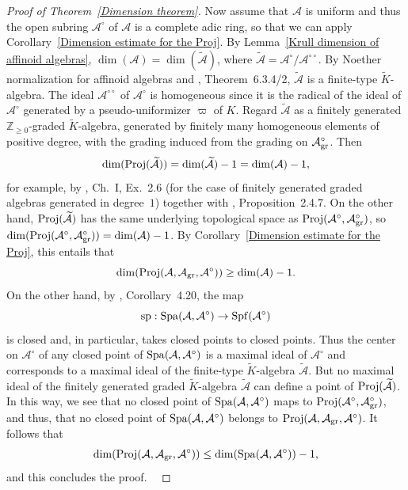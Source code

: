 \documentclass[12pt,twoside,a4paper]{article}
\theoremstyle{definition}
\theoremstyle{remark}
\newcommand\gr{{\rm gr}}
\newcommand\Proj{{\rm Proj}}
\newcommand\spc{{\rm sp}}
\newcommand\Spa{{\rm Spa}}
\newcommand\Spf{{\rm Spf}}
\begin{document}
\begin{proof}[Proof of Theorem~\ref{Dimension theorem}]
Now assume that $\mathcal{A}$ is uniform and thus the open subring $\mathcal{A}^{\circ}$ of $\mathcal{A}$ is a complete adic ring, so that we can apply Corollary~\ref{Dimension estimate for the Proj}. By Lemma~\ref{Krull dimension of affinoid algebras}, $\dim(\mathcal{A})=\dim(\widetilde{\mathcal{A}})$, where $\widetilde{\mathcal{A}}=\mathcal{A}^{\circ}/\mathcal{A}^{\circ\circ}$. By Noether normalization for affinoid algebras and \cite{BGR}, Theorem~6.3.4/2, $\widetilde{\mathcal{A}}$ is a finite-type $\widetilde{K}$-algebra. The ideal $\mathcal{A}^{\circ\circ}$ of $\mathcal{A}^{\circ}$ is homogeneous since it is the radical of the ideal of $\mathcal{A}^{\circ}$ generated by a pseudo-uniformizer $\varpi$ of $K$. Regard $\widetilde{\mathcal{A}}$ as a finitely generated $\mathbb{Z}_{\geq0}$-graded $\widetilde{K}$-algebra, generated by finitely many homogeneous elements of positive degree, with the grading induced from the grading on $\mathcal{A}_{\gr}^{\circ}$. Then \begin{equation*}\dim(\Proj(\widetilde{\mathcal{A}}))=\dim(\widetilde{\mathcal{A}})-1=\dim(\mathcal{A})-1,\end{equation*}for example, by \cite{Hartshorne}, Ch.~I, Ex.~2.6 (for the case of finitely generated graded algebras generated in degree~$1$) together with \cite{EGAII}, Proposition~2.4.7. On the other hand, $\Proj(\widetilde{\mathcal{A}})$ has the same underlying topological space as $\Proj(\mathcal{A}^{\circ}, \mathcal{A}_{\gr}^{\circ})$, so $\dim(\Proj(\mathcal{A}^{\circ}, \mathcal{A}_{\gr}^{\circ}))=\dim(\mathcal{A})-1$. By Corollary~\ref{Dimension estimate for the Proj}, this entails that \begin{equation*}\dim(\Proj(\mathcal{A}, \mathcal{A}_{\gr}, \mathcal{A}^{\circ}))\geq \dim(\mathcal{A})-1.\end{equation*}On the other hand, by \cite{Dine25-2}, Corollary~4.20, the map \begin{equation*}\spc: \Spa(\mathcal{A}, \mathcal{A}^{\circ})\to \Spf(\mathcal{A}^{\circ})\end{equation*}is closed and, in particular, takes closed points to closed points. Thus the center on $\mathcal{A}^{\circ}$ of any closed point of $\Spa(\mathcal{A}, \mathcal{A}^{\circ})$ is a maximal ideal of $\mathcal{A}^{\circ}$ and corresponds to a maximal ideal of the finite-type $\widetilde{K}$-algebra $\widetilde{\mathcal{A}}$. But no maximal ideal of the finitely generated graded $\widetilde{K}$-algebra $\widetilde{\mathcal{A}}$ can define a point of $\Proj(\widetilde{\mathcal{A}})$. In this way, we see that no closed point of $\Spa(\mathcal{A}, \mathcal{A}^{\circ})$ maps to $\Proj(\mathcal{A}^{\circ}, \mathcal{A}_{\gr}^{\circ})$, and thus, that no closed point of $\Spa(\mathcal{A}, \mathcal{A}^{\circ})$ belongs to $\Proj(\mathcal{A}, \mathcal{A}_{\gr}, \mathcal{A}^{\circ})$. It follows that \begin{equation*}\dim(\Proj(\mathcal{A}, \mathcal{A}_{\gr}, \mathcal{A}^{\circ}))\leq \dim(\Spa(\mathcal{A}, \mathcal{A}^{\circ}))-1,\end{equation*}and this concludes the proof.  \end{proof}
\end{document}
